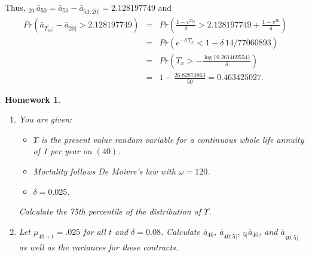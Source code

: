 \documentclass[11pt,fleqn,oneside]{book}
\newtheorem{homework}{Homework}
\begin{document}
\begin{enumerate}
Thus, $_{20|}\bar{a}_{50} =  \bar{a}_{50}  - \bar{a}_{50:\overline{20}|} = 2.128197749$
and
\begin{eqnarray*}
Pr\left(\bar{a}_{\overline{T_{50}}|} - \bar{a}_{\overline{20}|} > 2.128197749\right) &=& Pr\left(\frac{1 - v^{T_{50}}}{\delta} > 2.128197749 + \frac{1-v^{20}}{\delta}\right)\\
&=& Pr\left( e^{-\delta\,T_x} < 1 - \delta\,14/77060893\right) \\
&=& Pr\left(T_x > -\frac{\log\{0.261469554\}}{\delta}\right)\\
& =& 1 - \frac{26.82874863}{50} = 0.463425027.
\end{eqnarray*}
\end{enumerate}
\normalsize

\begin{homework}
\label{HW17}
\begin{enumerate}
\item You are given:
\begin{itemize}
\item $\Upsilon$ is the present value random variable for a continuous whole life annuity of 1 per year on $(40)$.
\item Mortality follows De Moivre's law with $\omega = 120$.
\item $\delta = 0.025$.
\end{itemize}
Calculate the 75th percentile of the distribution of $\Upsilon$.
\item Let $\mu_{40+t} = .025$ for all $t$ and $\delta =0.08$. Calculate $\bar{a}_{40}$, 
$\bar{a}_{40:\overline{5}|}$, $_{5|}\bar{a}_{40}$, and $\bar{a}_{\overline{40:\overline{5}|}}$ as well as the variances for these contracts.
\end{enumerate}
\end{homework}
\end{document}
